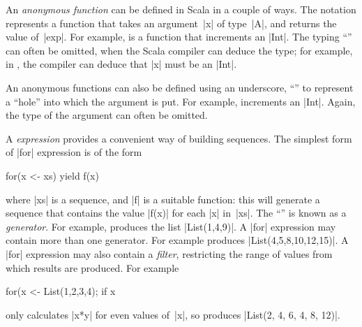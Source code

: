 
An \emph{anonymous function} can be defined in Scala in a
couple of ways.  The notation  represents a function that
takes an argument~|x| of type~|A|, and returns the value of~|exp|.  For
example,  is a function that increments an |Int|.  The
typing ``'' can often be omitted, when the Scala compiler can
deduce the type; for example, in , the
compiler can deduce that |x| must be an |Int|.

An anonymous functions can also be defined using an underscore, ``\SCALA{_}'' to
represent a ``hole'' into which the argument is put.  For example,
  increments an |Int|.  Again, the type of the
argument can often be omitted. 


A \emph{ expression}
provides a convenient way of building sequences.  The simplest form of |for|
expression is of the form
\begin{scala}
  for(x <- xs) yield f(x)
\end{scala}
where |xs| is a sequence, and |f| is a suitable function: this will generate a
sequence that contains the value |f(x)| for each |x| in~|xs|.  The ``'' is known as a \emph{generator}.  For example, 
produces the list |List(1,4,9)|.
%
A |for| expression may contain more than one generator.  For example
produces |List(4,5,8,10,12,15)|.  
%
A |for| expression may also contain a \emph{filter}, restricting the range of
values from which results are produced.  For example
\begin{scala}
  for(x <- List(1,2,3,4); if x%
\end{scala}
only calculates |x*y| for even values of~|x|, so produces
|List(2, 4, 6, 4, 8, 12)|.



